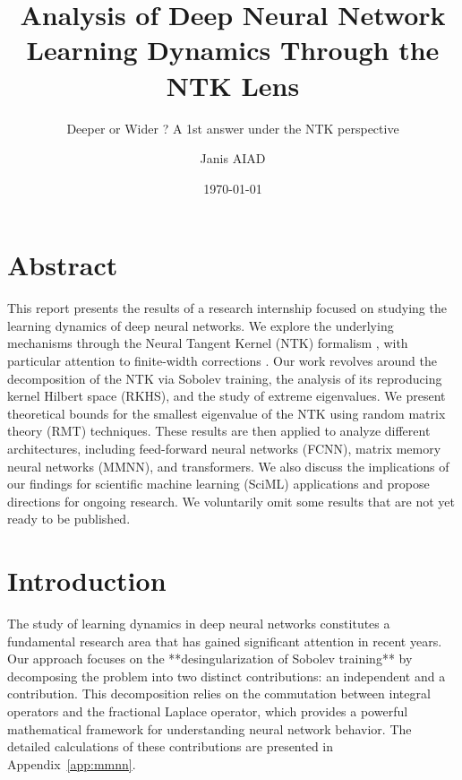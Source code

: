 \documentclass[a4paper]{article}
\author{Janis AIAD}
\date{\today}
\title{Analysis of Deep Neural Network Learning Dynamics Through the NTK Lens}
\subtitle{Deeper or Wider ? A 1st answer under the NTK perspective}
\newcommand{\Kop}{\textcolor{kernelcolor}{\mathbf{K}}}
\newcommand{\Pop}{\textcolor{sobolevcolor}{\mathbf{P}}}
\newcommand{\Kop}{\textcolor{kernelcolor}{\mathbf{K}}}
\newcommand{\Pop}{\textcolor{sobolevcolor}{\mathbf{P}}}
\newcommand{\Kop}{\textcolor{kernelcolor}{\mathbf{K}}}
\newcommand{\Pop}{\textcolor{sobolevcolor}{\mathbf{P}}}
\theoremstyle{plain}
\theoremstyle{definition}
\theoremstyle{remark}
\begin{document}
	\maketitle 
	
	\tableofcontents
\newpage

\section*{Abstract}
This report presents the results of a research internship focused on studying the learning dynamics of deep neural networks.
 We explore the underlying mechanisms through the Neural Tangent Kernel (NTK) formalism \cite{jacot2018neural}, with particular 
 attention to finite-width corrections \cite{seleznova2022ntk_beyond}. Our work revolves around the decomposition of the NTK via 
 Sobolev training, the analysis of its reproducing kernel Hilbert space (RKHS), and the study of extreme eigenvalues. We present
  theoretical bounds for the smallest eigenvalue of the NTK using random matrix theory (RMT) techniques. These results are then 
  applied to analyze different architectures, including feed-forward neural networks (FCNN), matrix memory neural networks (MMNN),
   and transformers. We also discuss the implications of our findings for scientific machine learning (SciML) applications and propose 
   directions for ongoing research. We voluntarily omit some results that are not yet ready to be published.

\newpage
{}


\newpage
{}
\section*{Introduction}

The study of learning dynamics in deep neural networks constitutes a fundamental research area that has gained significant attention in recent years. Our approach focuses on the **desingularization of Sobolev training** by decomposing the problem into two distinct contributions: an independent \Kop and a \Pop contribution. This decomposition relies on the commutation between integral operators and the fractional Laplace operator, which provides a powerful mathematical framework for understanding neural network behavior. The detailed calculations of these contributions are presented in Appendix~\ref{app:mmnn}.
\end{document}
